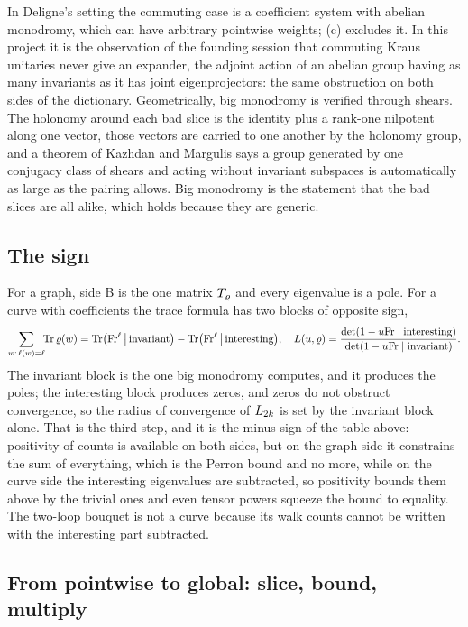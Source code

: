 In Deligne's setting the commuting case is a coefficient system with abelian monodromy, which can have
arbitrary pointwise weights; (c) excludes it. In this project it is the observation of the founding session
that commuting Kraus unitaries never give an expander, the adjoint action of an abelian group having as many
invariants as it has joint eigenprojectors: the same obstruction on both sides of the dictionary.
Geometrically, big monodromy is verified through shears. The holonomy around each bad slice is the identity
plus a rank-one nilpotent along one vector, those vectors are carried to one another by the holonomy group,
and a theorem of Kazhdan and Margulis says a group generated by one conjugacy class of shears and acting
without invariant subspaces is automatically as large as the pairing allows. Big monodromy is the statement
that the bad slices are all alike, which holds because they are generic.

\subsection{The sign}

For a graph, side B is the one matrix $T_{\varrho}$ and every eigenvalue is a pole. For a curve with
coefficients the trace formula has two blocks of opposite sign,
\[
\sum_{w:\,\ell(w)=\ell}\!\!\operatorname{Tr}\varrho(w) = \operatorname{Tr}\bigl(\mathrm{Fr}^{\ell}\,\big|\,\text{invariant}\bigr) -
\operatorname{Tr}\bigl(\mathrm{Fr}^{\ell}\,\big|\,\text{interesting}\bigr), \quad
  L(u,\varrho) = \frac{\det(1-u\mathrm{Fr}\mid\text{interesting})}{\det(1-u\mathrm{Fr}\mid\text{invariant})}.\]
The invariant block is the one big monodromy computes, and it produces the poles; the interesting block
produces zeros, and zeros do not obstruct convergence, so the radius of convergence of $L_{2k}$ is set
by the invariant block alone. That is the third step, and it is the minus sign of the table above:
positivity of counts is available on both sides, but on the graph side it constrains the sum of everything,
which is the Perron bound and no more, while on the curve side the interesting eigenvalues are subtracted,
so positivity bounds them above by the trivial ones and even tensor powers squeeze the bound to equality.
The two-loop bouquet is not a curve because its walk counts cannot be written with the interesting part
subtracted.

\subsection{From pointwise to global: slice, bound, multiply}


